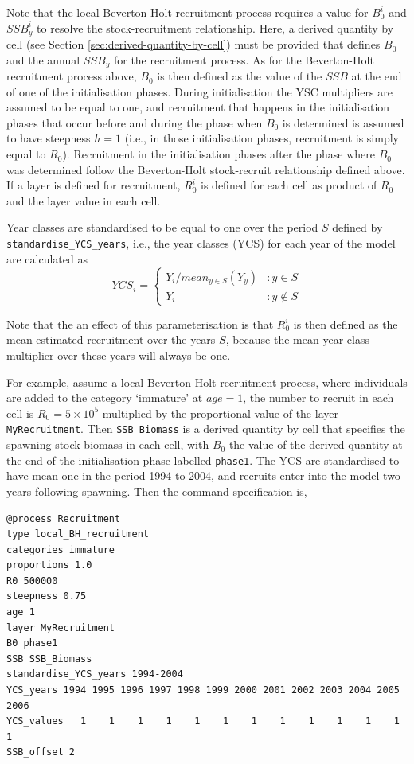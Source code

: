 Note that the local Beverton-Holt recruitment process requires a value for $B_0^i$ and $SSB_y^i$ to resolve the stock-recruitment relationship. Here, a derived quantity by cell (see Section \ref{sec:derived-quantity-by-cell}) must be provided that defines $B_0$ and the annual $SSB_y$ for the recruitment process. As for the Beverton-Holt recruitment process above, $B_0$ is then defined as the value of the $SSB$ at the end of one of the initialisation phases. During initialisation the YSC multipliers are assumed to be equal to one, and recruitment that happens in the initialisation phases that occur before and during the phase when $B_0$ is determined is assumed to have steepness $h=1$ (i.e., in those initialisation phases, recruitment is simply equal to $R_0$). Recruitment in the initialisation phases after the phase where $B_0$ was determined follow the Beverton-Holt stock-recruit relationship defined above. If a layer is defined for recruitment, $R_0^i$ is defined for each cell as product of $R_0$ and the layer value in each cell. 

Year classes are standardised to be equal to one over the period $S$ defined by \texttt{standardise\_YCS\_years}, i.e., the year classes (YCS) for each year of the model are calculated as 
\begin{equation}
  YCS_i = \left\{
	   \begin{array}{ll}
     Y_i / mean_{y \in S}(Y_y) & : y \in S \\
	   Y_i & : y \notin S
  \end{array}
  \right.
\end{equation}

Note that the an effect of this parameterisation is that $R_0^i$ is then defined as the mean estimated recruitment over the years $S$, because the mean year class multiplier over these years will always be one.

For example, assume a local Beverton-Holt recruitment process, where individuals are added to the category `immature' at $age=1$, the number to recruit in each cell is $R_0=5 \times 10^5$ multiplied by the proportional value of the layer \texttt{MyRecruitment}. Then \texttt{SSB\_Biomass} is a derived quantity by cell that specifies the spawning stock biomass in each cell, with $B_0$ the value of the derived quantity at the end of the initialisation phase labelled \texttt{phase1}. The YCS are standardised to have mean one in the period 1994 to 2004, and recruits enter into the model two years following spawning. Then the command specification is,
{\small{\begin{verbatim}
@process Recruitment
type local_BH_recruitment
categories immature
proportions 1.0
R0 500000
steepness 0.75
age 1
layer MyRecruitment
B0 phase1
SSB SSB_Biomass
standardise_YCS_years 1994-2004
YCS_years 1994 1995 1996 1997 1998 1999 2000 2001 2002 2003 2004 2005 2006
YCS_values   1    1    1    1    1    1    1    1    1    1    1    1    1
SSB_offset 2
\end{verbatim}}}

